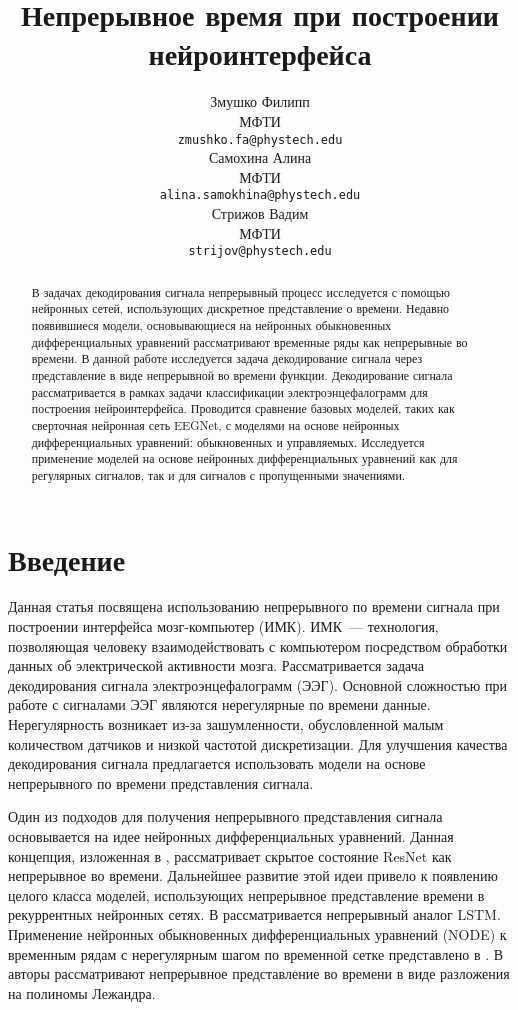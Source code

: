 \documentclass{article}
\title{Непрерывное время при построении нейроинтерфейса}
\author{ Змушко Филипп \\
	МФТИ \\
	\texttt{zmushko.fa@phystech.edu} \\
	\And
	Самохина Алина \\
	МФТИ\\
	\texttt{alina.samokhina@phystech.edu} \\
	\And
	Стрижов Вадим \\
	МФТИ\\
	\texttt{strijov@phystech.edu} \\
}
\date{}
\begin{document}
\maketitle

\begin{abstract}
	В задачах декодирования сигнала непрерывный процесс исследуется с помощью нейронных сетей, использующих дискретное представление о времени. Недавно появившиеся модели, основывающиеся на нейронных обыкновенных дифференциальных уравнений рассматривают временные ряды как непрерывные во времени.
    В данной работе исследуется задача декодирование сигнала через представление в виде непрерывной во времени функции. Декодирование сигнала рассматривается в рамках задачи классификации электроэнцефалограмм для построения нейроинтерфейса. Проводится сравнение базовых моделей, таких как сверточная нейронная сеть EEGNet, с моделями на основе нейронных дифференциальных уравнений: обыкновенных и управляемых. Исследуется применение моделей на основе нейронных дифференциальных уравнений как для регулярных сигналов, так и для сигналов с пропущенными значениями. 
\end{abstract}


\section{\textbf{Введение}}
Данная статья посвящена  использованию непрерывного по времени сигнала при построении интерфейса мозг-компьютер (ИМК). ИМК~--- технология, позволяющая человеку взаимодействовать с компьютером посредством обработки данных об электрической активности мозга. Рассматривается задача декодирования сигнала электроэнцефалограмм (ЭЭГ). Основной сложностью при работе с сигналами ЭЭГ являются нерегулярные по времени данные. Нерегулярность возникает из-за зашумленности, обусловленной малым количеством датчиков и низкой частотой дискретизации. Для улучшения качества декодирования сигнала предлагается использовать модели на основе непрерывного по времени представления сигнала.

Один из подходов для получения непрерывного представления сигнала основывается на идее нейронных дифференциальных уравнений. Данная концепция, изложенная в \cite{NEURIPS2018_69386f6b}, рассматривает скрытое состояние ResNet как непрерывное во времени. Дальнейшее развитие этой идеи привело к появлению целого класса моделей, использующих непрерывное представление времени в рекуррентных нейронных сетях. В \cite{lechner2020longterm} рассматривается непрерывный аналог LSTM. Применение нейронных обыкновенных дифференциальных уравнений (NODE) к временным рядам с нерегулярным шагом по временной сетке представлено в \cite{cde}. В \cite{NEURIPS2019_952285b9} авторы рассматривают непрерывное представление во времени в виде разложения на полиномы Лежандра. 
\end{document}
